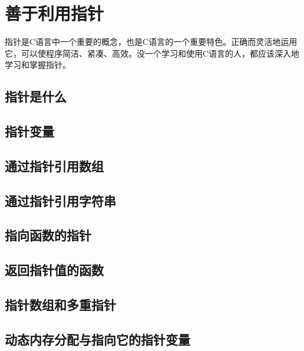 \chapter{善于利用指针}
指针是C语言中一个重要的概念，也是C语言的一个重要特色。正确而灵活地运用它，可以使程序简洁、紧凑、高效。没一个学习和使用C语言的人，都应该深入地学习和掌握指针。

\section{指针是什么}
\section{指针变量}
\section{通过指针引用数组}
\section{通过指针引用字符串}
\section{指向函数的指针}
\section{返回指针值的函数}
\section{指针数组和多重指针}
\section{动态内存分配与指向它的指针变量}

